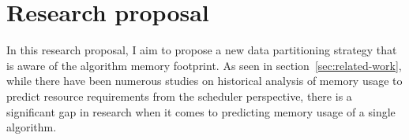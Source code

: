 \section{Research proposal}
\label{sec:research-proposal}

In this research proposal, I aim to propose a new data partitioning strategy that is aware of the algorithm memory footprint.
As seen in section~\ref{sec:related-work}, while there have been numerous studies on historical analysis of memory usage to predict resource requirements from the scheduler perspective, there is a significant gap in research when it comes to predicting memory usage of a single algorithm. 







